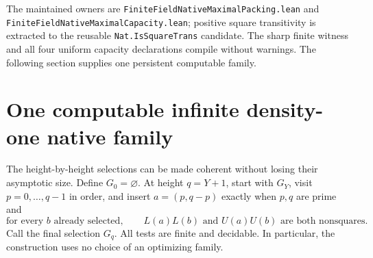 \documentclass[11pt]{article}
\begin{document}
The maintained owners are
\texttt{FiniteFieldNativeMaximalPacking.lean} and
\texttt{FiniteFieldNativeMaximalCapacity.lean}; positive square transitivity
is extracted to the reusable \texttt{Nat.IsSquareTrans} candidate.
The sharp finite witness and all four uniform capacity declarations
compile without warnings. The following section supplies one persistent
computable family.

\section{One computable infinite density-one native family}
\label{sec:native-coherent-family}
The height-by-height selections can be made coherent without losing
their asymptotic size. Define \(G_0=\varnothing\). At height \(q=Y+1\),
start with \(G_Y\), visit \(p=0,\ldots,q-1\) in order, and insert
\(a=(p,q-p)\) exactly when \(p,q\) are prime and
\[
 \text{for every }b\text{ already selected},\qquad
 L(a)L(b)\text{ and }U(a)U(b)\text{ are both nonsquares}.
\]
Call the final selection \(G_q\). All tests are finite and decidable.
In particular, the construction uses no choice of an optimizing family.
\end{document}

